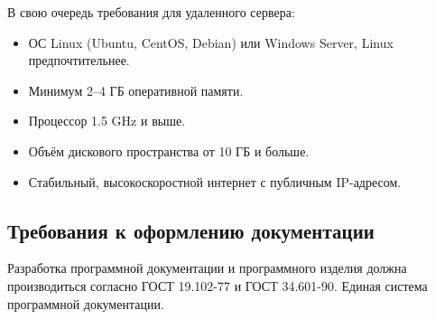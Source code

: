 В свою очередь требования для удаленного сервера:
\begin{itemize}
	\item ОС Linux (Ubuntu, CentOS, Debian) или Windows Server, Linux предпочтительнее.
	\item Минимум 2–4 ГБ оперативной памяти.
	\item Процессор 1.5 GHz и выше.
	\item Объём дискового пространства от 10 ГБ и больше.
	\item Стабильный, высокоскоростной интернет с публичным IP-адресом.		
\end{itemize}
\subsection{Требования к оформлению документации}

Разработка программной документации и программного изделия должна производиться согласно ГОСТ 19.102-77 и ГОСТ 34.601-90. Единая система программной документации.